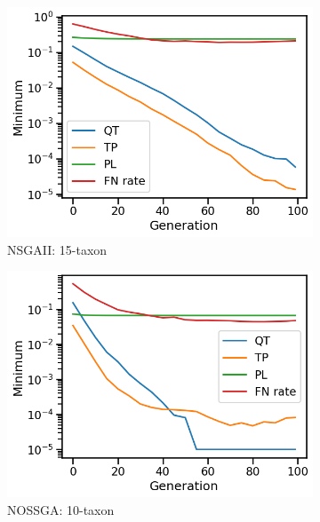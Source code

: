 \begin{figure}[!htbp]
\begin{adjustwidth}{-1cm}{-1cm}
\begin{subfigure}[b]{0.4\textwidth}
			\includegraphics[width=\textwidth]{Figure/15-taxon_NSGAII_minimum}
			\caption{NSGAII: 15-taxon}
		\end{subfigure}
		\begin{subfigure}[b]{0.4\textwidth}
			\includegraphics[width=\textwidth]{Figure/10-taxon_NOSSGA_minimum}
			\caption{NOSSGA: 10-taxon}
		\end{subfigure}%
		\begin{subfigure}[b]{0.4\textwidth}

\end{subfigure}
\end{adjustwidth}
\end{figure}

